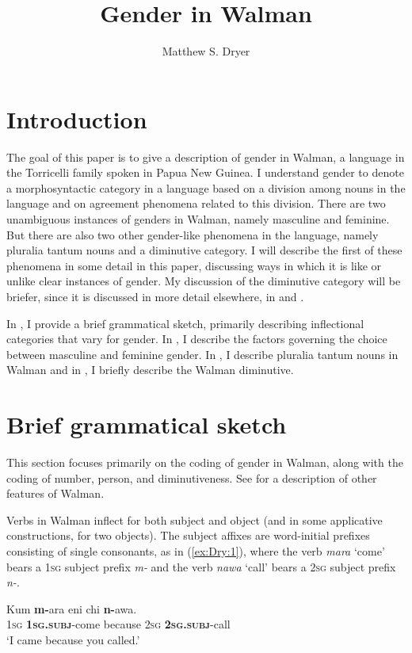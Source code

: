 \documentclass[output=collectionpaper]{langsci/langscibook}
\title{Gender in Walman%
}
\author{%
Matthew S. Dryer
\affiliation{University at Buffalo}
}%
\begin{document}
\section{Introduction}

The goal of this paper is to give a description of gender in Walman, a language in the Torricelli family spoken in Papua New Guinea. I understand gender to denote a morphosyntactic category in a language based on a division among nouns in the language and on agreement phenomena related to this division. There are two unambiguous instances of genders in Walman, namely masculine and feminine. But there are also two other gender-like phenomena in the language, namely pluralia tantum nouns and a diminutive category. I will describe the first of these phenomena in some detail in this paper, discussing ways in which it is like or unlike clear instances of gender. My discussion of the diminutive category will be briefer, since it is discussed in more detail elsewhere, in \citet{Dryer2016} and \citet{DryerUnderrevision}.

In , I provide a brief grammatical sketch, primarily describing inflectional categories that vary for gender. In , I describe the factors governing the choice between masculine and feminine gender. In , I describe pluralia tantum nouns in Walman and in , I briefly describe the Walman diminutive.

\section{Brief grammatical sketch}
\label{sec:Dry:2}

This section focuses primarily on the coding of gender in Walman, along with the coding of number, person, and diminutiveness. See \citet{DryerInpreparation} for a description of other features of Walman.

Verbs in Walman inflect for both subject and object (and in some applicative constructions, for two objects). The subject affixes are word-initial prefixes consisting of single consonants, as in (\ref{ex:Dry:1}), where the verb \textit{mara} `come' bears a \textsc{1sg} subject prefix \textit{m-} and the verb \textit{nawa} `call' bears a \textsc{2sg} subject prefix \textit{n-}.

\ea \label{ex:Dry:1}
\gll Kum \textbf{m-}ara eni chi \textbf{n-}awa.\\
\textsc{1sg} \textbf{\textsc{1sg.subj}}-come because \textsc{2sg} \textbf{\textsc{2sg.subj}}-call\\
\glt `I came because you called.'
\z
\end{document}

